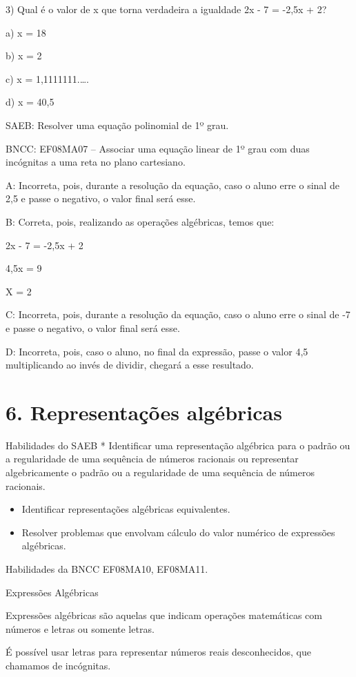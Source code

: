 3) Qual é o valor de x que torna verdadeira a igualdade 2x - 7 = -2,5x +
2?

a) x = 18

b) x = 2

c) x = 1,1111111.\ldots.

d) x = 40,5

SAEB: Resolver uma equação polinomial de 1º grau.

BNCC: EF08MA07 -- Associar uma equação linear de 1º grau com duas
incógnitas a uma reta no plano cartesiano.

A: Incorreta, pois, durante a resolução da equação, caso o aluno erre o
sinal de 2,5 e passe o negativo, o valor final será esse.

B: Correta, pois, realizando as operações algébricas, temos que:

2x - 7 = -2,5x + 2

4,5x = 9

X = 2

C: Incorreta, pois, durante a resolução da equação, caso o aluno erre o
sinal de -7 e passe o negativo, o valor final será esse.

D: Incorreta, pois, caso o aluno, no final da expressão, passe o valor
4,5 multiplicando ao invés de dividir, chegará a esse resultado.


\section{6. Representações
algébricas}

Habilidades do SAEB * Identificar uma representação algébrica para o
padrão ou a regularidade de uma sequência de números racionais ou
representar algebricamente o padrão ou a regularidade de uma sequência
de números racionais.

\begin{itemize}
\item
  Identificar representações algébricas equivalentes.
\item
  Resolver problemas que envolvam cálculo do valor numérico de
  expressões algébricas.
\end{itemize}

Habilidades da BNCC EF08MA10, EF08MA11.

Expressões Algébricas

Expressões algébricas são aquelas que indicam operações matemáticas com
números e letras ou somente letras.

É possível usar letras para representar números reais desconhecidos, que
chamamos de incógnitas.

